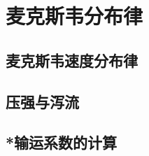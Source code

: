 

\section{麦克斯韦分布律}\label{14-3}

\subsection{麦克斯韦速度分布律}\label{14-3-1}

\subsection{压强与泻流}\label{14-3-2}

\subsection{*输运系数的计算}\label{14-3-3}
